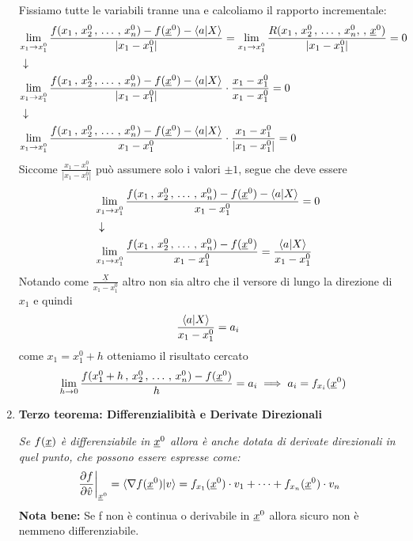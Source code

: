 \begin{enumerate}
	Fissiamo tutte le variabili tranne una e calcoliamo il rapporto incrementale:
	\begin{align}
	{}&\underset{x_1 \rightarrow x_1^0}{\lim} \,\frac{f(x_1\, , \, x_2^0\, , \, \dots \, , \, x_n^0) - f(\underline{x}^0) - \braket{a|X}}{|x_1 - x_1^0|}=\underset{x_1 \rightarrow x_1^0}{\lim} \, \frac{R(x_1\, , \, x_2^0\, , \, \dots \, , \, x_n^0, \, , \, \underline{x}^0)}{|x_1 - x_1^0|}= 0 \nonumber \\ &\downarrow \nonumber \\
	& \underset{x_1 \rightarrow x_1^0}{\lim} \,\frac{f(x_1\, , \, x_2^0\, , \, \dots \, , \, x_n^0) - f(\underline{x}^0) - \braket{a|X}}{|x_1 - x_1^0|} \cdot \frac{x_1 - x_1^0}{x_1 - x_1^0} = 0 \nonumber \\ &\downarrow \nonumber \\
	& \underset{x_1 \rightarrow x_1^0}{\lim} \,\frac{f(x_1\, , \, x_2^0\, , \, \dots \, , \, x_n^0) - f(\underline{x}^0) - \braket{a|X}}{x_1 - x_1^0} \cdot \frac{x_1 - x_1^0}{|x_1 - x_1^0|} = 0
	\end{align}
	Siccome $\frac{x_1 - x_1^0}{|x_1 - x_1^0|}$ può assumere solo i valori $\pm 1$, segue che deve essere
	\begin{align}
	{}&\underset{x_1 \rightarrow x_1^0}{\lim} \,\frac{f(x_1\, , \, x_2^0\, , \, \dots \, , \, x_n^0) - f(\underline{x}^0) - \braket{a|X}}{x_1 - x_1^0}=0 \nonumber \\ &\downarrow \nonumber \\
	&\underset{x_1 \rightarrow x_1^0}{\lim} \,\frac{f(x_1\, , \, x_2^0\, , \, \dots \, , \, x_n^0) - f(\underline{x}^0)}{x_1 - x_1^0} = \frac{\braket{a|X}}{x_1 - x_1^0}
	\end{align}
	Notando come $\frac{\underline{X}}{x_1 - x_1^0}$ altro non sia altro che il versore di lungo la direzione di $x_1$ e quindi
	\begin{align}
	\frac{\braket{a|X}}{x_1 - x_1^0}=a_i
	\end{align}
	come $x_1=x_1^0 + h$ otteniamo il risultato cercato
	\begin{align}
	{}&\underset{h \rightarrow 0}{\lim} \,\frac{f(x_1^0 + h \, , \, x_2^0\, , \, \dots \, , \, x_n^0) - f(\underline{x}^0)}{h} = a_i \implies a_i = f_{x_i}(\underline{x}^0)
	\end{align}
	
	\item \textbf{Terzo teorema: Differenzialibità e Derivate Direzionali}
	
	\textit{Se $f(\underline{x})$ è differenziabile in $\underline{x}^0$ allora è anche dotata di derivate direzionali in quel punto, che possono essere espresse come:}
		\begin{align}
	\left. \frac{\partial f}{\partial \hat{v}}\right|_{\underline{x}^0}= \braket{\nabla f(\underline{x}^0)|v}=f_{x_1}(\underline{x}^0) \cdot v_1 + \dots + f_{x_n}(\underline{x}^0) \cdot v_n
	\end{align}
	\textbf{Nota bene:} Se f non è continua o derivabile in $\underline{x}^0$ allora sicuro non è nemmeno differenziabile.
	

\end{enumerate}
